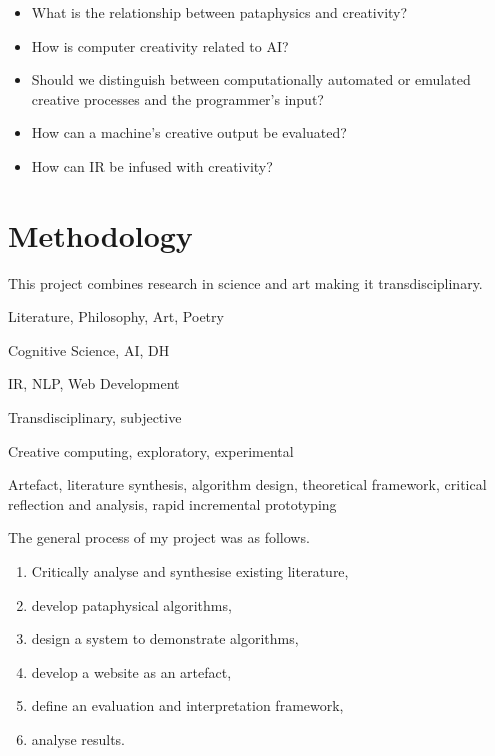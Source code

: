 \begin{itemize}
  \item What is the relationship between pataphysics and creativity?
  \item How is computer creativity related to \ac{AI}?
  \item Should we distinguish between computationally automated or emulated creative processes and the programmer's input?
  \item How can a machine's creative output be evaluated?
  \item How can \ac{IR} be infused with creativity?
\end{itemize}


\section{Methodology}
\label{s:intromethod}

This project combines research in science and art making it transdisciplinary.

\begin{description}[leftmargin=3cm]
  \item [Pataphysics] Literature, Philosophy, Art, Poetry
  \item [Creativity] Cognitive Science, \ac{AI}, \ac{DH}
  \item [Technology] \ac{IR}, \ac{NLP}, Web Development
\end{description}

\begin{description}[leftmargin=3cm]
  \item [Epistemology] Transdisciplinary, subjective
  \item [Methodology] Creative computing, exploratory, experimental
  \item [Methods] Artefact, literature synthesis, algorithm design, theoretical framework, critical reflection and analysis, rapid incremental prototyping
\end{description}

The general process of my project was as follows.

\begin{enumerate}
  \item Critically analyse and synthesise existing literature,\marginpar{\textspiral~\ref{p:lit}}
  \item develop pataphysical algorithms,\marginpar{\textspiral~\ref{p:practice}}
  \item design a system to demonstrate algorithms,\marginpar{\textspiral~\ref{p:practice}}
  \item develop a website as an artefact,\marginpar{\textspiral~\ref{p:practice}}
  \item define an evaluation and interpretation framework,\marginpar{\textspiral~\ref{p:theory}}
  \item analyse results.\marginpar{\textspiral~\ref{p:analysis}}
\end{enumerate}


